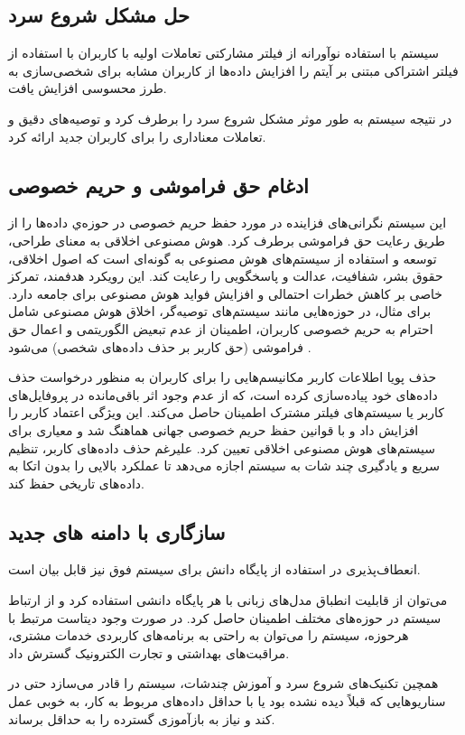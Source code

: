 \subsection{حل مشکل شروع سرد}
سیستم با استفاده نوآورانه از فیلتر مشارکتی تعاملات اولیه با کاربران با استفاده از فیلتر اشتراکی مبتنی بر آیتم را افزایش داده‌ها از کاربران مشابه برای شخصی‌سازی به طرز محسوسی افزایش یافت.

در نتیجه سیستم به طور موثر مشکل شروع سرد را برطرف کرد و توصیه‌های دقیق و تعاملات معناداری را برای کاربران جدید ارائه کرد.

\subsection{ادغام حق فراموشی و حریم خصوصی}
این سیستم نگرانی‌های فزاینده در مورد حفظ حریم خصوصی در حوزه‌ي داده‌ها را از طریق رعایت حق فراموشی برطرف کرد.
هوش مصنوعی اخلاقی به معنای طراحی، توسعه و استفاده از سیستم‌های هوش مصنوعی به گونه‌ای است که اصول اخلاقی، حقوق بشر، شفافیت، عدالت و پاسخگویی را رعایت کند. این رویکرد هدفمند، تمرکز خاصی بر کاهش خطرات احتمالی و افزایش فواید هوش مصنوعی برای جامعه دارد. برای مثال، در حوزه‌هایی مانند سیستم‌های توصیه‌گر، اخلاق هوش مصنوعی شامل احترام به حریم خصوصی کاربران، اطمینان از عدم تبعیض الگوریتمی و اعمال حق فراموشی (حق کاربر بر حذف داده‌های شخصی) می‌شود %
\cite{camilleri2024artificial}
.

 حذف پویا اطلاعات کاربر مکانیسم‌هایی را برای کاربران به منظور درخواست حذف داده‌های خود پیاده‌سازی کرده است، که از عدم وجود اثر باقی‌مانده در پروفایل‌های کاربر یا سیستم‌های فیلتر مشترک اطمینان حاصل می‌کند. این ویژگی اعتماد کاربر را افزایش داد و با قوانین حفظ حریم خصوصی جهانی هماهنگ شد و معیاری برای سیستم‌های هوش مصنوعی اخلاقی تعیین کرد. علیرغم حذف داده‌های کاربر، تنظیم سریع و یادگیری چند شات به سیستم اجازه می‌دهد تا عملکرد بالایی را بدون اتکا به داده‌های تاریخی حفظ کند.

\subsection{سازگاری با دامنه های جدید}

 انعطاف‌پذیری در استفاده از پایگاه دانش برای سیستم فوق نیز قابل بیان است.

 می‌توان از قابلیت انطباق مدل‌های زبانی با هر پایگاه دانشی استفاده کرد و از ارتباط سیستم در حوزه‌های مختلف اطمینان حاصل کرد. در صورت وجود دیتاست‌ مرتبط با هرحوزه، سیستم را می‌توان به راحتی به برنامه‌های کاربردی خدمات مشتری، مراقبت‌های بهداشتی و تجارت الکترونیک گسترش داد.

همچین تکنیک‌های شروع سرد و آموزش چندشات، سیستم را قادر می‌سازد حتی در سناریوهایی که قبلاً دیده نشده بود یا با حداقل داده‌های مربوط به کار، به خوبی عمل کند و نیاز به بازآموزی گسترده را به حداقل برساند.

